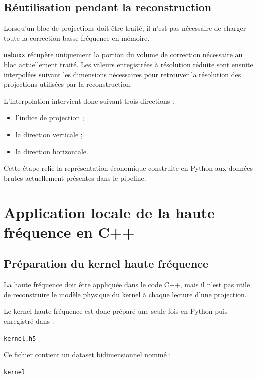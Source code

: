 \documentclass[11pt,a4paper]{report}
\begin{document}
\subsection{Réutilisation pendant la reconstruction}

Lorsqu'un bloc de projections doit être traité, il n'est pas nécessaire de
charger toute la correction basse fréquence en mémoire.

\texttt{nabuxx} récupère uniquement la portion du volume de correction
nécessaire au bloc actuellement traité. Les valeurs enregistrées à
résolution réduite sont ensuite interpolées suivant les dimensions
nécessaires pour retrouver la résolution des projections utilisées par la
reconstruction.

L'interpolation intervient donc suivant trois directions :

\begin{itemize}
    \item l'indice de projection ;
    \item la direction verticale ;
    \item la direction horizontale.
\end{itemize}

Cette étape relie la représentation économique construite en Python aux
données brutes actuellement présentes dans le pipeline.

\section{Application locale de la haute fréquence en C++}

\subsection{Préparation du kernel haute fréquence}

La haute fréquence doit être appliquée dans le code C++, mais il n'est pas
utile de reconstruire le modèle physique du kernel à chaque lecture d'une
projection.

Le kernel haute fréquence est donc préparé une seule fois en Python puis
enregistré dans :

\begin{center}
\texttt{kernel.h5}
\end{center}

Ce fichier contient un dataset bidimensionnel nommé :

\begin{center}
\texttt{kernel}
\end{center}
\end{document}
